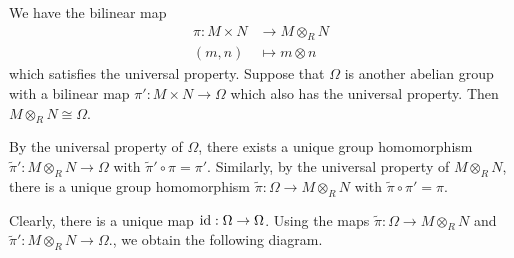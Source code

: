 \begin{prop}{}
    We have the bilinear map 
    \begin{align*} 
        \pi : M \times N &\to M \otimes_R N \\ 
        (m, n) &\mapsto m \otimes n
    \end{align*}
    which satisfies the universal property. Suppose that $\Omega$ is 
    another abelian group with a bilinear map $\pi' : M \times N 
    \to \Omega$ which also has the universal property. Then 
    $M \otimes_R N \cong \Omega$. 
\end{prop}
\begin{pf}
    By the universal property of $\Omega$, there exists a unique group 
    homomorphism $\tilde\pi' : M \otimes_R N \to \Omega$ with $\tilde\pi' \circ \pi = \pi'$. 
    Similarly, by the universal property of $M \otimes_R N$, there 
    is a unique group homomorphism $\tilde\pi : \Omega \to M \otimes_R N$
    with $\tilde\pi \circ \pi' = \pi$. 
    \begin{center}
    \end{center} 
    Clearly, there is a unique map $\operatorname{id} : \Omega \to \Omega$. 
    Using the maps $\tilde\pi : \Omega \to M \otimes_R N$ and 
    $\tilde\pi' : M \otimes_R N \to \Omega$., we obtain the following diagram. 
    \begin{center}

\end{center}
\end{pf}

